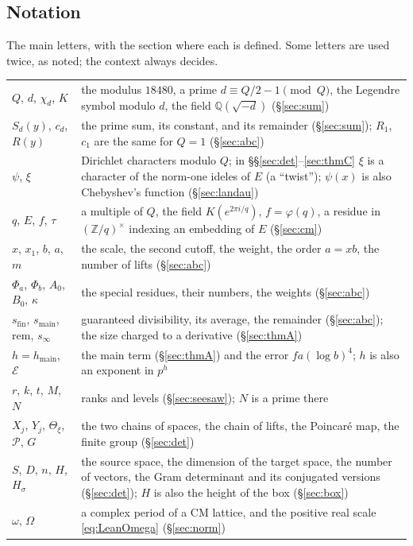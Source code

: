 \documentclass[11pt]{amsart}
\numberwithin{equation}{section}
\theoremstyle{definition}
\theoremstyle{remark}
\newcommand{\Z}{\mathbb Z}
\newcommand{\Q}{\mathbb Q}
\begin{document}
\subsection*{Notation}
The main letters, with the section where each is defined. Some letters are used twice, as noted; the context always decides.
\begin{center}\small
\begin{tabular}{@{}p{} p{}@{}}
\toprule
$Q$, $d$, $\chi_d$, $K$ & the modulus $18480$, a prime $d\equiv Q/2-1\pmod Q$, the Legendre symbol modulo $d$, the field $\Q(\sqrt{-d})$ (\S\ref{sec:sum})\\
$S_d(y)$, $c_d$, $R(y)$ & the prime sum, its constant, and its remainder (\S\ref{sec:sum}); $R_1$, $c_1$ are the same for $Q=1$ (\S\ref{sec:abc})\\
$\psi$, $\xi$ & Dirichlet characters modulo $Q$; in \S\S\ref{sec:det}--\ref{sec:thmC} $\xi$ is a character of the norm-one ideles of $E$ (a ``twist''); $\psi(x)$ is also Chebyshev's function (\S\ref{sec:landau})\\
$q$, $E$, $f$, $\tau$ & a multiple of $Q$, the field $K(e^{2\pi i/q})$, $f=\varphi(q)$, a residue in $(\Z/q)^\times$ indexing an embedding of $E$ (\S\ref{sec:cm})\\
$x$, $x_1$, $b$, $a$, $m$ & the scale, the second cutoff, the weight, the order $a=xb$, the number of lifts (\S\ref{sec:abc})\\
$\Phi_a$, $\Phi_b$, $A_0$, $B_0$, $\kappa$ & the special residues, their numbers, the weights (\S\ref{sec:abc})\\
$s_{\mathrm{fin}}$, $s_{\mathrm{main}}$, $\mathrm{rem}$, $s_\infty$ & guaranteed divisibility, its average, the remainder (\S\ref{sec:abc}); the size charged to a derivative (\S\ref{sec:thmA})\\
$h=h_{\mathrm{main}}$, $\mathcal E$ & the main term (\S\ref{sec:thmA}) and the error $fa(\log b)^4$; $h$ is also an exponent in $p^h$\\
$r$, $k$, $t$, $M$, $N$ & ranks and levels (\S\ref{sec:seesaw}); $N$ is a prime there\\
$X_j$, $Y_j$, $\Theta_\xi$, $\mathcal P$, $G$ & the two chains of spaces, the chain of lifts, the Poincar\'e map, the finite group (\S\ref{sec:det})\\
$S$, $D$, $n$, $H$, $H_\sigma$ & the source space, the dimension of the target space, the number of vectors, the Gram determinant and its conjugated versions (\S\ref{sec:det}); $H$ is also the height of the box (\S\ref{sec:box})\\
$\omega$, $\Omega$ & a complex period of a CM lattice, and the positive real scale \eqref{eq:LeanOmega} (\S\ref{sec:norm})\\
\bottomrule
\end{tabular}
\end{center}
\end{document}
